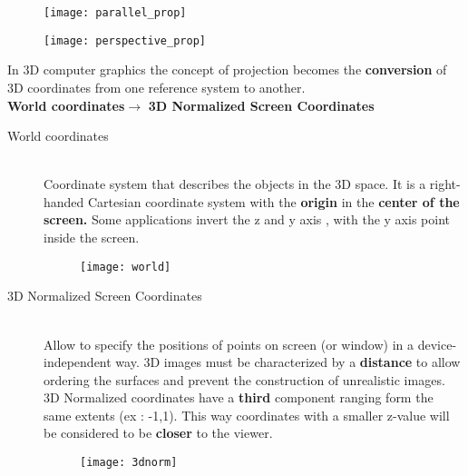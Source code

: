\begin{figure}[H]
\begin{minipage}{.5\textwidth}
 \centering
  \texttt{[image: parallel\_prop]}
\end{minipage}%
	\begin{minipage}{.5\textwidth}
  \centering
  \texttt{[image: perspective\_prop]}
\end{minipage}%
\end{figure}
In 3D computer graphics the concept of projection becomes the \textbf{conversion} of 3D coordinates from one reference system to another.\\
\textbf{World coordinates}$\to$ \textbf{3D Normalized Screen Coordinates}\\
\begin{description}
\item[World coordinates]\hfill\\
Coordinate system that describes the objects in the 3D space. It is a right-handed Cartesian coordinate system with the \textbf{origin} in the \textbf{center of the screen.}
Some applications invert the z and y axis , with the y axis point inside the screen.
\begin{figure}[H]
 \centering
  \texttt{[image: world]}
\end{figure}
\item[3D Normalized Screen Coordinates]\hfill\\
Allow to specify the positions of points on screen (or window) in a device-independent way. 3D images must be characterized by a \textbf{distance} to allow ordering the surfaces and prevent the construction of unrealistic images.\\
3D Normalized coordinates have a \textbf{third} component ranging form the same extents (ex : -1,1). This way coordinates with a smaller z-value will be considered to be \textbf{closer} to the viewer.
\begin{figure}[H]
 \centering
  \texttt{[image: 3dnorm]}
\end{figure}
\end{description}

